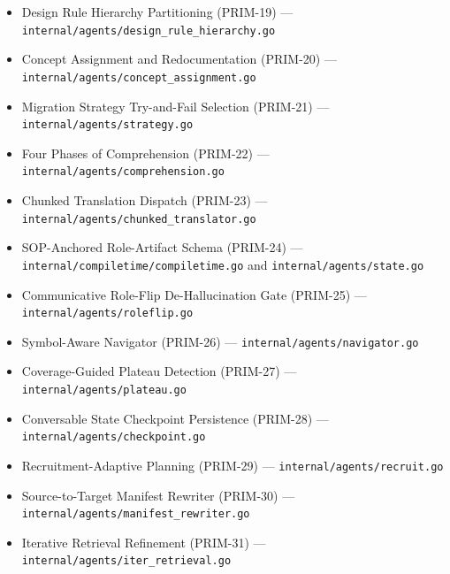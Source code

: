 \begin{itemize}
\item Design Rule Hierarchy Partitioning (PRIM-19) --- \texttt{internal/agents/design\_rule\_hierarchy.go}
\item Concept Assignment and Redocumentation (PRIM-20) --- \texttt{internal/agents/concept\_assignment.go}
\item Migration Strategy Try-and-Fail Selection (PRIM-21) --- \texttt{internal/agents/strategy.go}
\item Four Phases of Comprehension (PRIM-22) --- \texttt{internal/agents/comprehension.go}
\item Chunked Translation Dispatch (PRIM-23) --- \texttt{internal/agents/chunked\_translator.go}
\item SOP-Anchored Role-Artifact Schema (PRIM-24) --- \texttt{internal/compiletime/compiletime.go} and \texttt{internal/agents/state.go}
\item Communicative Role-Flip De-Hallucination Gate (PRIM-25) --- \texttt{internal/agents/roleflip.go}
\item Symbol-Aware Navigator (PRIM-26) --- \texttt{internal/agents/navigator.go}
\item Coverage-Guided Plateau Detection (PRIM-27) --- \texttt{internal/agents/plateau.go}
\item Conversable State Checkpoint Persistence (PRIM-28) --- \texttt{internal/agents/checkpoint.go}
\item Recruitment-Adaptive Planning (PRIM-29) --- \texttt{internal/agents/recruit.go}
\item Source-to-Target Manifest Rewriter (PRIM-30) --- \texttt{internal/agents/manifest\_rewriter.go}
\item Iterative Retrieval Refinement (PRIM-31) --- \texttt{internal/agents/iter\_retrieval.go}
\end{itemize}
